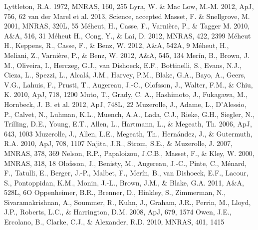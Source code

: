 \documentclass[apj]{emulateapj}
\begin{document}
\begin{thebibliography}{}
 Lyttleton, R.A. 1972, MNRAS, 160, 255
 Lyra, W. \& Mac Low, M.-M. 2012, ApJ, 756, 62
 van der Marel et al. 2013, Science, accepted
 Masset, F. \& Snellgrove, M. 2001, MNRAS, 320L, 55
 M\'eheut, H., Casse, F., Varni\`ere, P., \& Tagger M. 2010, A\&A, 516, 31
 M\'eheut H., Cong, Y., \& Lai, D. 2012, MNRAS, 422, 2399
 M\'eheut H., Keppens,  R., Casse, F., \& Benz, W. 2012, A\&A, 542A, 9
 M\'eheut, H., Meliani, Z., Varni\`ere, P., \& Benz, W. 2012, A\&A, 545, 134
 Mer\'in, B., Brown, J. M., Oliveira, I., Herczeg, G.J., van Dishoeck, E.F., 
  Bottinelli, S., Evans, N.J., Cieza, L., Spezzi, L., Alcal\'a, J.M., Harvey, P.M., Blake, G.A., Bayo, A., Geers, V.G., 
  Lahuis, F., Prusti, T., Augereau, J.-C., Olofsson, J., Walter, F.M., \& Chiu, K. 2010, ApJ, 718, 1200
 Muto, T., Grady, C. A., Hashimoto, J., Fukagawa, M., Hornbeck, J. B. et al. 2012, ApJ, 748L, 22
 Muzerolle, J., Adame, L., D'Alessio, P., Calvet, N., Luhman, K.L., Muench, A.A., 
  Lada, C.J., Rieke, G.H., Siegler, N., Trilling, D.E., Young, E.T., Allen, L., Hartmann, L., \& Megeath, Th. 2006, ApJ, 643, 1003
 Muzerolle, J., Allen, L.E., Megeath, Th., Hern\'andez, J., \& Gutermuth, R.A. 2010, ApJ, 708, 1107
 Najita, J.R., Strom, S.E., \& Muzerolle, J. 2007, MNRAS, 378, 369
 Nelson, R.P., Papaloizou, J.C.B., Masset, F., \& Kley, W. 2000, MNRAS, 318, 18
 Olofsson, J., Benisty, M., Augereau, J.-C., Pinte, C., M\'enard, F., Tatulli, E., 
  Berger, J.-P., Malbet, F., Mer\'in, B., van Dishoeck, E.F., Lacour, S., Pontoppidan, K.M., Monin, J.-L., Brown, J.M., \& Blake, G.A. 2011, A\&A, 528L, 6O
 Oppenheimer, B.R., Brenner, D., Hinkley, S., Zimmerman, N., Sivaramakrishnan, A., 
  Soummer, R., Kuhn, J., Graham, J.R., Perrin, M., Lloyd, J.P., Roberts, L.C., \& Harrington, D.M. 2008, ApJ, 679, 1574
 Owen, J.E., Ercolano, B., Clarke, C.J., \& Alexander, R.D. 2010, MNRAS, 401, 1415

\end{thebibliography}
\end{document}
